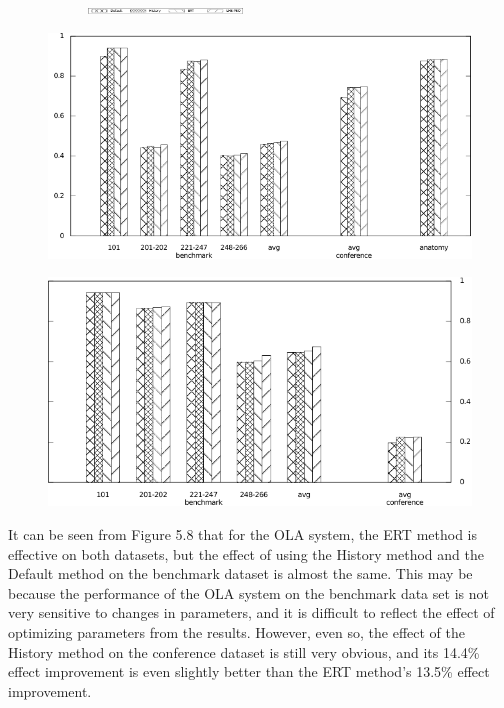 \documentclass[twoside]{article}
\begin{document}
\begin{figure}[htb!]\centering
\begin{subfigure}{\textwidth}
	\centering
	\includegraphics[width=0.45\textwidth]{figures/legend.pdf}
\end{subfigure}
\begin{minipage}{0.49\textwidth}
	\centering
	\includegraphics[width=\textwidth]{data_figs/LogMap_F1-Measure.pdf}
	\label{fig:LogMap_F1-Measure}
\end{minipage}
\begin{minipage}{0.49\textwidth}
	\centering
	\includegraphics[width=\textwidth]{data_figs/OLA_F1-Measure.pdf}
	\label{fig:OLA_F1-Measure}
\end{minipage}
\end{figure}

It can be seen from Figure 5.8 that for the OLA system, the ERT method is effective on both datasets, but the effect of using the History method and the Default method on the benchmark dataset is almost the same.
This may be because the performance of the OLA system on the benchmark data set is not very sensitive to changes in parameters, and it is difficult to reflect the effect of optimizing parameters from the results.
However, even so, the effect of the History method on the conference dataset is still very obvious, and its 14.4\% effect improvement is even slightly better than the ERT method's 13.5\% effect improvement.
\end{document}
